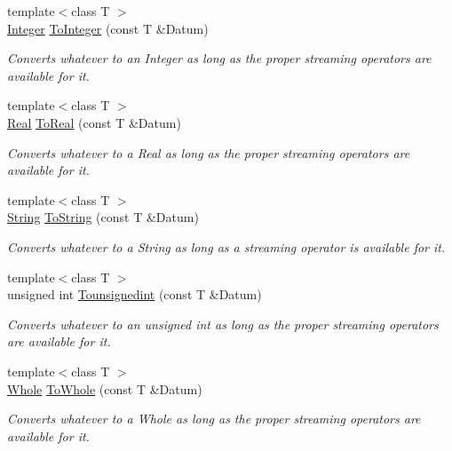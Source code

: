 \begin{DoxyCompactItemize}
{\footnotesize template$<$class T $>$ }\\\hyperlink{namespacephys_a7f09bf5585b2bb97613cd9aad4273a81}{Integer} \hyperlink{namespacephys_a7fe8a4cf645e000483652f26ef8d6e47}{ToInteger} (const T \&Datum)
\begin{DoxyCompactList}\small\item\em Converts whatever to an Integer as long as the proper streaming operators are available for it. \item\end{DoxyCompactList}\item 
{\footnotesize template$<$class T $>$ }\\\hyperlink{namespacephys_af7eb897198d265b8e868f45240230d5f}{Real} \hyperlink{namespacephys_ac5ff9d58be770f2fe8c4928eb160c88a}{ToReal} (const T \&Datum)
\begin{DoxyCompactList}\small\item\em Converts whatever to a Real as long as the proper streaming operators are available for it. \item\end{DoxyCompactList}\item 
{\footnotesize template$<$class T $>$ }\\\hyperlink{namespacephys_aa03900411993de7fbfec4789bc1d392e}{String} \hyperlink{namespacephys_ae81e34843c6c569026b9a7d9d54c4f04}{ToString} (const T \&Datum)
\begin{DoxyCompactList}\small\item\em Converts whatever to a String as long as a streaming operator is available for it. \item\end{DoxyCompactList}\item 
{\footnotesize template$<$class T $>$ }\\unsigned int \hyperlink{namespacephys_a16ab66903d5e438a04f4e859c8aa47a7}{Tounsignedint} (const T \&Datum)
\begin{DoxyCompactList}\small\item\em Converts whatever to an unsigned int as long as the proper streaming operators are available for it. \item\end{DoxyCompactList}\item 
{\footnotesize template$<$class T $>$ }\\\hyperlink{namespacephys_a460f6bc24c8dd347b05e0366ae34f34a}{Whole} \hyperlink{namespacephys_a53d44a46cab542ef86a541af5f1a7b62}{ToWhole} (const T \&Datum)
\begin{DoxyCompactList}\small\item\em Converts whatever to a Whole as long as the proper streaming operators are available for it. \item\end{DoxyCompactList}\end{DoxyCompactItemize}


